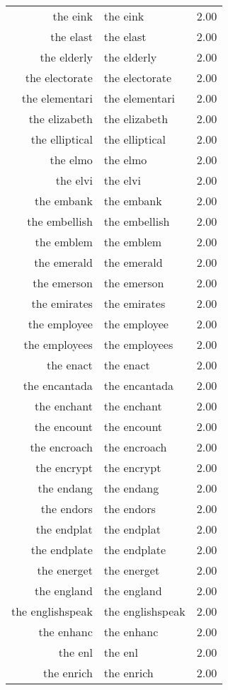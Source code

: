 \begin{table}[ht]
\begin{tabular}{rlr}
  the eink & the eink & 2.00 \\ 
  the elast & the elast & 2.00 \\ 
  the elderly & the elderly & 2.00 \\ 
  the electorate & the electorate & 2.00 \\ 
  the elementari & the elementari & 2.00 \\ 
  the elizabeth & the elizabeth & 2.00 \\ 
  the elliptical & the elliptical & 2.00 \\ 
  the elmo & the elmo & 2.00 \\ 
  the elvi & the elvi & 2.00 \\ 
  the embank & the embank & 2.00 \\ 
  the embellish & the embellish & 2.00 \\ 
  the emblem & the emblem & 2.00 \\ 
  the emerald & the emerald & 2.00 \\ 
  the emerson & the emerson & 2.00 \\ 
  the emirates & the emirates & 2.00 \\ 
  the employee & the employee & 2.00 \\ 
  the employees & the employees & 2.00 \\ 
  the enact & the enact & 2.00 \\ 
  the encantada & the encantada & 2.00 \\ 
  the enchant & the enchant & 2.00 \\ 
  the encount & the encount & 2.00 \\ 
  the encroach & the encroach & 2.00 \\ 
  the encrypt & the encrypt & 2.00 \\ 
  the endang & the endang & 2.00 \\ 
  the endors & the endors & 2.00 \\ 
  the endplat & the endplat & 2.00 \\ 
  the endplate & the endplate & 2.00 \\ 
  the energet & the energet & 2.00 \\ 
  the england & the england & 2.00 \\ 
  the englishspeak & the englishspeak & 2.00 \\ 
  the enhanc & the enhanc & 2.00 \\ 
  the enl & the enl & 2.00 \\ 
  the enrich & the enrich & 2.00 \\ 

\end{tabular}
\end{table}
